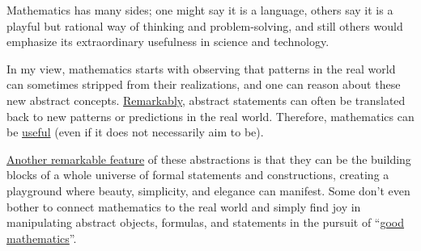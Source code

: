 \documentclass{article}
\begin{document}
Mathematics has many sides; one might say it is a language, others say it is a playful but rational way of thinking and problem-solving, and still others would emphasize its extraordinary usefulness in science and technology.

In my view, mathematics starts with observing that patterns in the real world can sometimes stripped from their realizations, and one can reason about these new abstract concepts. \href{https://www.maths.ed.ac.uk/~v1ranick/papers/wigner.pdf}{Remarkably}, abstract statements can often be translated back to new patterns or predictions in the real world. Therefore, mathematics can be \href{https://www.youtube.com/watch?v=BQHbdi8A0p8}{useful} (even if it does not necessarily aim to be).

\href{https://archive.org/details/hardy_annotated}{Another remarkable feature} of these abstractions is that they can be the building blocks of a whole universe of formal statements and constructions, creating a playground where beauty, simplicity, and elegance can manifest.
Some don't even bother to connect mathematics to the real world and simply find joy in manipulating abstract objects, formulas, and statements in the pursuit of ``\href{https://arxiv.org/pdf/math/0702396}{good mathematics}''.
\end{document}
